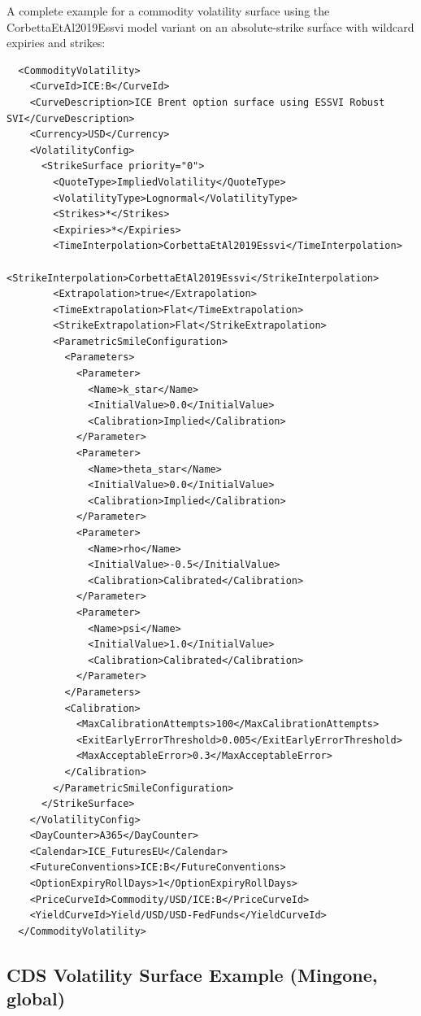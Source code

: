 \documentclass{amsart}
\theoremstyle{plain}
\numberwithin{equation}{section}
\begin{document}
A complete example for a commodity volatility surface using the CorbettaEtAl2019Essvi model variant
on an absolute-strike surface with wildcard expiries and strikes:

\begin{verbatim}
  <CommodityVolatility>
    <CurveId>ICE:B</CurveId>
    <CurveDescription>ICE Brent option surface using ESSVI Robust SVI</CurveDescription>
    <Currency>USD</Currency>
    <VolatilityConfig>
      <StrikeSurface priority="0">
        <QuoteType>ImpliedVolatility</QuoteType>
        <VolatilityType>Lognormal</VolatilityType>
        <Strikes>*</Strikes>
        <Expiries>*</Expiries>
        <TimeInterpolation>CorbettaEtAl2019Essvi</TimeInterpolation>
        <StrikeInterpolation>CorbettaEtAl2019Essvi</StrikeInterpolation>
        <Extrapolation>true</Extrapolation>
        <TimeExtrapolation>Flat</TimeExtrapolation>
        <StrikeExtrapolation>Flat</StrikeExtrapolation>
        <ParametricSmileConfiguration>
          <Parameters>
            <Parameter>
              <Name>k_star</Name>
              <InitialValue>0.0</InitialValue>
              <Calibration>Implied</Calibration>
            </Parameter>
            <Parameter>
              <Name>theta_star</Name>
              <InitialValue>0.0</InitialValue>
              <Calibration>Implied</Calibration>
            </Parameter>
            <Parameter>
              <Name>rho</Name>
              <InitialValue>-0.5</InitialValue>
              <Calibration>Calibrated</Calibration>
            </Parameter>
            <Parameter>
              <Name>psi</Name>
              <InitialValue>1.0</InitialValue>
              <Calibration>Calibrated</Calibration>
            </Parameter>
          </Parameters>
          <Calibration>
            <MaxCalibrationAttempts>100</MaxCalibrationAttempts>
            <ExitEarlyErrorThreshold>0.005</ExitEarlyErrorThreshold>
            <MaxAcceptableError>0.3</MaxAcceptableError>
          </Calibration>
        </ParametricSmileConfiguration>
      </StrikeSurface>
    </VolatilityConfig>
    <DayCounter>A365</DayCounter>
    <Calendar>ICE_FuturesEU</Calendar>
    <FutureConventions>ICE:B</FutureConventions>
    <OptionExpiryRollDays>1</OptionExpiryRollDays>
    <PriceCurveId>Commodity/USD/ICE:B</PriceCurveId>
    <YieldCurveId>Yield/USD/USD-FedFunds</YieldCurveId>
  </CommodityVolatility>
\end{verbatim}

\subsection{CDS Volatility Surface Example (Mingone, global)}
\end{document}
